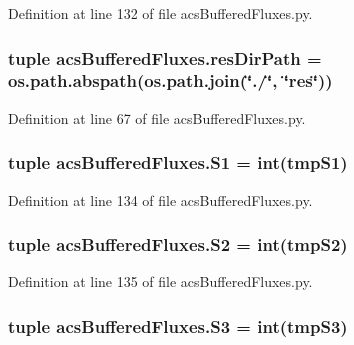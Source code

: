 Definition at line 132 of file acs\-Buffered\-Fluxes.\-py.

\hypertarget{a00092_abc625ab1aeed5741a02bbaccfbee5c06}{
\subsubsection[{res\-Dir\-Path}]{\setlength{\rightskip}{0pt plus 5cm}tuple acs\-Buffered\-Fluxes.\-res\-Dir\-Path = os.\-path.\-abspath(os.\-path.\-join(\char`\"{}./\char`\"{}, \char`\"{}res\char`\"{}))}}\label{a00092_abc625ab1aeed5741a02bbaccfbee5c06}


Definition at line 67 of file acs\-Buffered\-Fluxes.\-py.

\hypertarget{a00092_ab1521c41c4bbd4df7a741e0f58e760f1}{
\subsubsection[{S1}]{\setlength{\rightskip}{0pt plus 5cm}tuple acs\-Buffered\-Fluxes.\-S1 = int(tmp\-S1)}}\label{a00092_ab1521c41c4bbd4df7a741e0f58e760f1}


Definition at line 134 of file acs\-Buffered\-Fluxes.\-py.

\hypertarget{a00092_a812cd646e9a7a994e7ec3eae8c2371f4}{
\subsubsection[{S2}]{\setlength{\rightskip}{0pt plus 5cm}tuple acs\-Buffered\-Fluxes.\-S2 = int(tmp\-S2)}}\label{a00092_a812cd646e9a7a994e7ec3eae8c2371f4}


Definition at line 135 of file acs\-Buffered\-Fluxes.\-py.

\hypertarget{a00092_ad28d690663b4722db331f9046d80d16c}{
\subsubsection[{S3}]{\setlength{\rightskip}{0pt plus 5cm}tuple acs\-Buffered\-Fluxes.\-S3 = int(tmp\-S3)}}\label{a00092_ad28d690663b4722db331f9046d80d16c}


